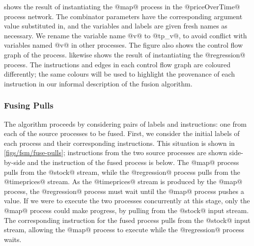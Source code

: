  shows the result of instantiating the @map@ process in the @priceOverTime@ process network.
The combinator parameters have the corresponding argument value substituted in, and the variables and labels are given fresh names as necessary.
We rename the variable name @v@ to @tp_v@, to avoid conflict with variables named @v@ in other processes.
The figure also shows the control flow graph of the process.
 likewise shows the result of instantiating the @regression@ process.
The instructions and edges in each control flow graph are coloured differently; the same colours will be used to highlight the provenance of each instruction in our informal description of the fusion algorithm.



\subsubsection{Fusing Pulls}
\label{s:Fusion:FusingPulls}

The algorithm proceeds by considering pairs of labels and instructions: one from each of the source processes to be fused.
First, we consider the initial labels of each process and their corresponding instructions.
This situation is shown in \cref{figs/fsm/fuse-pulls}; instructions from the two source processes are shown side-by-side and the instruction of the fused process is below.
The @map@ process pulls from the @stock@ stream, while the @regression@ process pulls from the @timeprices@ stream.
As the @timeprices@ stream is produced by the @map@ process, the @regression@ process must wait until the @map@ process pushes a value.
If we were to execute the two processes concurrently at this stage, only the @map@ process could make progress, by pulling from the @stock@ input stream.
The corresponding instruction for the fused process pulls from the @stock@ input stream, allowing the @map@ process to execute while the @regression@ process waits.


